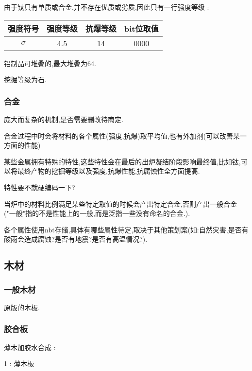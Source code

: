 {{{          由于钛只有单质或合金,并不存在优质或劣质,因此只有一行强度等级 :
          \begin{center}
              \begin{tabular}{|c|c|c|c|}
                  \hline
                  强度符号 & 强度等级 & 抗爆等级 & bit位取值 \\
                  \hline
                  $\sigma$ & 4.5      & 14       & 0000      \\
                  \hline
              \end{tabular}
          \end{center}

          铝制品可堆叠的,最大堆叠为64.

          挖掘等级为石.
      }

      \subsubsection{合金}{
          庞大而复杂的机制,是否需要删改待商定.

          合金过程中时会将材料的各个属性(强度,抗爆)取平均值,也有外加剂(可以改善某一方面的性能)

          某些金属拥有特殊的特性,这些特性会在最后的出炉凝结阶段影响最终值,比如钛,可以将最终产物的挖掘等级以及强度,抗爆性能,抗腐蚀性全方面提高.

          特性要不就硬编码一下?

          当炉中的材料比例满足某些特定取值的时候会产出特定合金,否则产出一般合金("一般"指的不是性能上的一般,而是泛指一些没有命名的合金.).

          各个属性使用nbt存储,具体有哪些属性待定,取决于其他策划案(如:自然灾害,是否有酸雨会造成腐蚀?是否有地震?是否有高温情况?).
      }
  }

  \subsection{木材}{
      \subsubsection{一般木材}{
          原版的木板.
      }

      \subsubsection{胶合板}{
          薄木加胶水合成 :
          \begin{center}
              1 : 薄木板


\end{center}}}}
